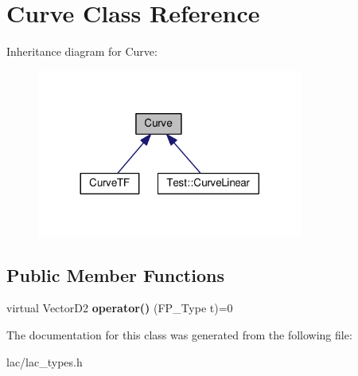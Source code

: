 \hypertarget{classCurve}{}\section{Curve Class Reference}
\label{classCurve}


Inheritance diagram for Curve\+:\nopagebreak
\begin{figure}[H]
\begin{center}
\leavevmode
\includegraphics[width=248pt]{classCurve__inherit__graph}
\end{center}
\end{figure}
\subsection*{Public Member Functions}
\begin{DoxyCompactItemize}
\item 
\mbox{\label{classCurve_a474b9f54f114e203a285801eefff70e8}} 
virtual Vector\+D2 {\bfseries operator()} (F\+P\+\_\+\+Type t)=0
\end{DoxyCompactItemize}


The documentation for this class was generated from the following file\+:\begin{DoxyCompactItemize}
\item 
lac/lac\+\_\+types.\+h\end{DoxyCompactItemize}
